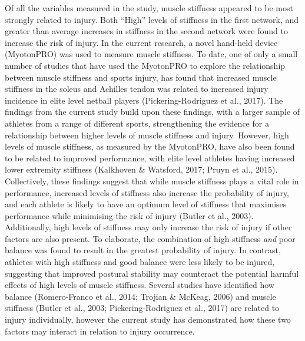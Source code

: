 \documentclass[
  english,
  man,floatsintext]{apa6}
\begin{document}
Of all the variables measured in the study, muscle stiffness appeared to be most strongly related to injury.
Both \enquote{High} levels of stiffness in the first network, and greater than average increases in stiffness in the second network were found to increase the risk of injury.
In the current research, a novel hand-held device (MyotonPRO) was used to measure muscle stiffness.
To date, one of only a small number of studies that have used the MyotonPRO to explore the relationship between muscle stiffness and sports injury, has found that increased muscle stiffness in the soleus and Achilles tendon was related to increased injury incidence in elite level netball players (Pickering-Rodriguez et al., 2017).
The findings from the current study build upon these findings, with a larger sample of athletes from a range of different sports, strengthening the evidence for a relationship between higher levels of muscle stiffness and injury.
However, high levels of muscle stiffness, as measured by the MyotonPRO, have also been found to be related to improved performance, with elite level athletes having increased lower extremity stiffness (Kalkhoven \& Watsford, 2017; Pruyn et al., 2015).
Collectively, these findings suggest that while muscle stiffness plays a vital role in performance, increased levels of stiffness also increase the probability of injury, and each athlete is likely to have an optimum level of stiffness that maximises performance while minimising the risk of injury (Butler et al., 2003).
Additionally, high levels of stiffness may only increase the risk of injury if other factors are also present.
To elaborate, the combination of high stiffness \emph{and} poor balance was found to result in the greatest probability of injury.
In contrast, athletes with high stiffness and good balance were less likely to be injured, suggesting that improved postural stability may counteract the potential harmful effects of high levels of muscle stiffness.
Several studies have identified how balance (Romero-Franco et al., 2014; Trojian \& McKeag, 2006) and muscle stiffness (Butler et al., 2003; Pickering-Rodriguez et al., 2017) are related to injury individually, however the current study has demonstrated how these two factors may interact in relation to injury occurrence.
\end{document}
